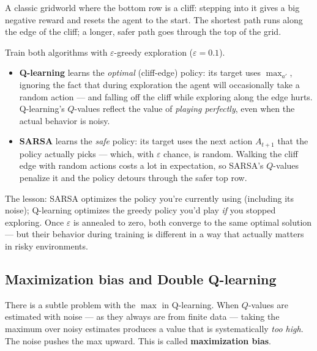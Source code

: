 \documentclass[11pt, oneside]{book}
\begin{document}
\begin{exbox}[title={Cliff Walking: SARSA vs.\ Q-learning}]
A classic gridworld where the bottom row is a cliff: stepping into it gives a big
negative reward and resets the agent to the start. The shortest path runs along the
edge of the cliff; a longer, safer path goes through the top of the grid.

Train both algorithms with $\varepsilon$-greedy exploration ($\varepsilon = 0.1$).
\begin{itemize}
  \item \textbf{Q-learning} learns the \emph{optimal} (cliff-edge) policy: its target
    uses $\max_{a'}$, ignoring the fact that during exploration the agent will
    occasionally take a random action --- and falling off the cliff while exploring
    along the edge hurts.
    Q-learning's $Q$-values reflect the value of \emph{playing perfectly}, even when
    the actual behavior is noisy.
  \item \textbf{SARSA} learns the \emph{safe} policy: its target uses the
    next action $A_{t+1}$ that the policy actually picks --- which, with $\varepsilon$
    chance, is random. Walking the cliff edge with random actions costs a lot in
    expectation, so SARSA's $Q$-values penalize it and the policy detours through the
    safer top row.
\end{itemize}
The lesson: SARSA optimizes the policy you're currently using (including its noise);
Q-learning optimizes the greedy policy you'd play \emph{if} you stopped exploring.
Once $\varepsilon$ is annealed to zero, both converge to the same optimal solution ---
but their behavior during training is different in a way that actually matters in
risky environments.
\end{exbox}

\subsection{Maximization bias and Double Q-learning}

There is a subtle problem with the $\max$ in Q-learning.
When $Q$-values are estimated with noise --- as they always are from finite data ---
taking the maximum over noisy estimates produces a value that is systematically
\emph{too high}. The noise pushes the max upward.
This is called \textbf{maximization bias}.
\end{document}
